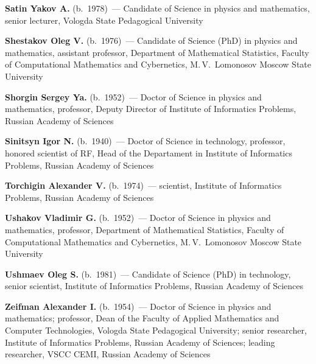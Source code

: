 \begin{multicols}{2}
\noindent %
\textbf{Satin Yakov A.} (b.\ 1978)~--- %
Candidate of Science in physics and
mathematics, senior lecturer, Vologda State Pedagogical University

\vspace*{6pt}

\noindent %
\textbf{Shestakov Oleg V.} (b.\ 1976)~--- Candidate of Science (PhD) in physics and mathematics,
assistant professor, Department of Mathematical Statistics, Faculty of Computational Mathematics and Cybernetics,
M.\,V.~Lomonosov Moscow State University


\vspace*{9pt}

\noindent %
\textbf{Shorgin Sergey Ya.} (b.\ 1952)~--- Doctor of Science in physics and mathematics,
professor, Deputy Director of Institute of Informatics Problems, Russian Academy of
Sciences



\vspace*{9pt}

\noindent %
\textbf{Sinitsyn Igor N.} (b.\ 1940)~--- Doctor of Science in technology,
professor, honored scientist  of RF,
Head of the Departament in Institute of Informatics Problems,  Russian Academy of Sciences


\vspace*{9pt}

\noindent %
\textbf{Torchigin Alexander V.} (b.\ 1974)~--- scientist,
Institute of Informatics Problems,  Russian Academy of Sciences

\vspace*{9pt}


\noindent %
\textbf{Ushakov Vladimir G.} (b.\ 1952)~--- Doctor of Science in physics and mathematics,
professor, Department of Mathematical Statistics, Faculty of Computational Mathematics and Cybernetics,
M.\,V.~Lomonosov Moscow State University

\vspace*{9pt}






\noindent %
\textbf{Ushmaev Oleg S.} (b.\ 1981)~---
Candidate of Science (PhD) in technology, senior scientist,
Institute of Informatics Problems,  Russian Academy of Sciences

\vspace*{9pt}



\noindent %
\textbf{Zeifman Alexander I.} (b.\ 1954)~--- Doctor of Science in physics and
mathematics; professor, Dean of the Faculty of Applied Mathematics
and Computer Technologies, Vologda State Pedagogical University;
senior researcher, Institute of Informatics Problems, Russian Academy of Sciences; leading
researcher, VSCC CEMI,  Russian Academy of Sciences

\end{multicols}